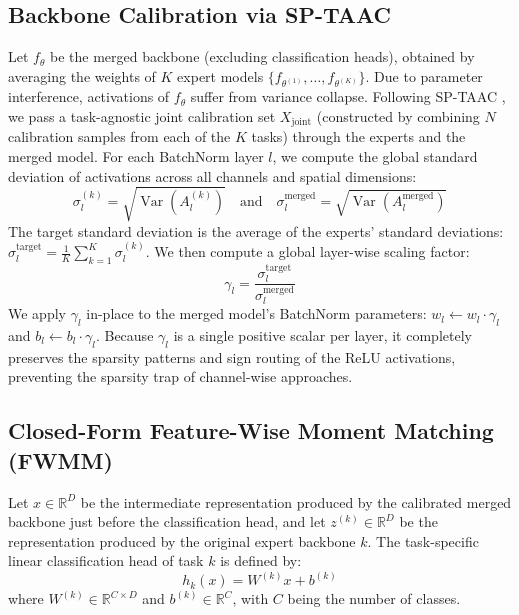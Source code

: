 \documentclass{article}
\theoremstyle{plain}
\theoremstyle{definition}
\theoremstyle{remark}
\begin{document}
\subsection{Backbone Calibration via SP-TAAC}
Let $f_{\theta}$ be the merged backbone (excluding classification heads), obtained by averaging the weights of $K$ expert models $\{f_{\theta^{(1)}}, \dots, f_{\theta^{(K)}}\}$. Due to parameter interference, activations of $f_{\theta}$ suffer from variance collapse. Following SP-TAAC \cite{SPTAAC26}, we pass a task-agnostic joint calibration set $X_{\text{joint}}$ (constructed by combining $N$ calibration samples from each of the $K$ tasks) through the experts and the merged model. For each BatchNorm layer $l$, we compute the global standard deviation of activations across all channels and spatial dimensions:
\begin{equation}
\sigma_{l}^{(k)} = \sqrt{\operatorname{Var}(A_l^{(k)})} \quad \text{and} \quad \sigma_{l}^{\text{merged}} = \sqrt{\operatorname{Var}(A_l^{\text{merged}})}
\end{equation}
The target standard deviation is the average of the experts' standard deviations: $\sigma_{l}^{\text{target}} = \frac{1}{K}\sum_{k=1}^K \sigma_{l}^{(k)}$. We then compute a global layer-wise scaling factor:
\begin{equation}
\gamma_l = \frac{\sigma_{l}^{\text{target}}}{\sigma_{l}^{\text{merged}}}
\end{equation}
We apply $\gamma_l$ in-place to the merged model's BatchNorm parameters: $w_l \leftarrow w_l \cdot \gamma_l$ and $b_l \leftarrow b_l \cdot \gamma_l$. Because $\gamma_l$ is a single positive scalar per layer, it completely preserves the sparsity patterns and sign routing of the ReLU activations, preventing the sparsity trap of channel-wise approaches.

\subsection{Closed-Form Feature-Wise Moment Matching (FWMM)}
Let $x \in \mathbb{R}^D$ be the intermediate representation produced by the calibrated merged backbone just before the classification head, and let $z^{(k)} \in \mathbb{R}^D$ be the representation produced by the original expert backbone $k$. The task-specific linear classification head of task $k$ is defined by:
\begin{equation}
h_k(x) = W^{(k)} x + b^{(k)}
\end{equation}
where $W^{(k)} \in \mathbb{R}^{C \times D}$ and $b^{(k)} \in \mathbb{R}^C$, with $C$ being the number of classes.
\end{document}
